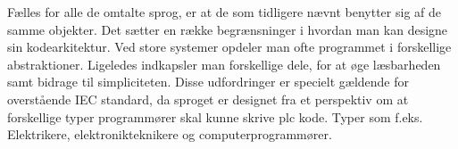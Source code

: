 Fælles for alle de omtalte sprog, er at de som tidligere nævnt benytter sig af de samme objekter. Det sætter en række begrænsninger i hvordan man kan designe sin kodearkitektur. Ved store systemer opdeler man ofte programmet i forskellige abstraktioner. Ligeledes indkapsler man forskellige dele, for at øge læsbarheden samt bidrage til simpliciteten. Disse udfordringer er specielt gældende for overstående IEC standard, da sproget er designet fra et perspektiv om at forskellige typer programmører skal kunne skrive plc kode. Typer som f.eks. Elektrikere, elektronikteknikere og computerprogrammører.